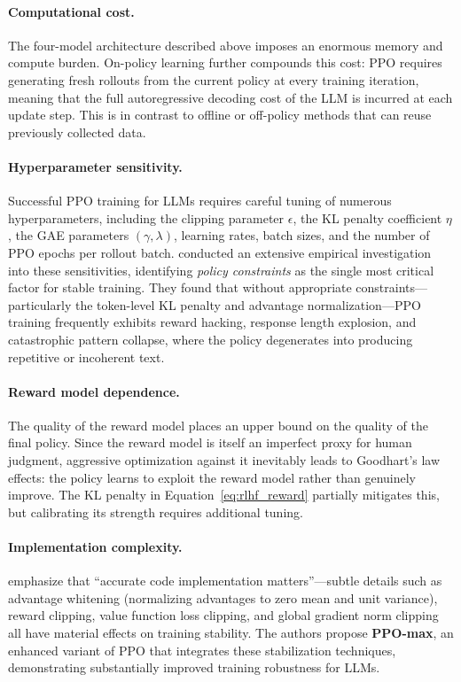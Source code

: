 \paragraph{Computational cost.} The four-model architecture described above imposes an enormous memory and compute burden. On-policy learning further compounds this cost: PPO requires generating fresh rollouts from the current policy at every training iteration, meaning that the full autoregressive decoding cost of the LLM is incurred at each update step. This is in contrast to offline or off-policy methods that can reuse previously collected data.

\paragraph{Hyperparameter sensitivity.} Successful PPO training for LLMs requires careful tuning of numerous hyperparameters, including the clipping parameter $\epsilon$, the KL penalty coefficient $\eta$, the GAE parameters $(\gamma, \lambda)$, learning rates, batch sizes, and the number of PPO epochs per rollout batch. \cite{zheng2023secrets} conducted an extensive empirical investigation into these sensitivities, identifying \emph{policy constraints} as the single most critical factor for stable training. They found that without appropriate constraints---particularly the token-level KL penalty and advantage normalization---PPO training frequently exhibits reward hacking, response length explosion, and catastrophic pattern collapse, where the policy degenerates into producing repetitive or incoherent text.

\paragraph{Reward model dependence.} The quality of the reward model places an upper bound on the quality of the final policy. Since the reward model is itself an imperfect proxy for human judgment, aggressive optimization against it inevitably leads to Goodhart's law effects: the policy learns to exploit the reward model rather than genuinely improve. The KL penalty in Equation~\eqref{eq:rlhf_reward} partially mitigates this, but calibrating its strength requires additional tuning.

\paragraph{Implementation complexity.} \cite{zheng2023secrets} emphasize that ``accurate code implementation matters''---subtle details such as advantage whitening (normalizing advantages to zero mean and unit variance), reward clipping, value function loss clipping, and global gradient norm clipping all have material effects on training stability. The authors propose \textbf{PPO-max}, an enhanced variant of PPO that integrates these stabilization techniques, demonstrating substantially improved training robustness for LLMs.

